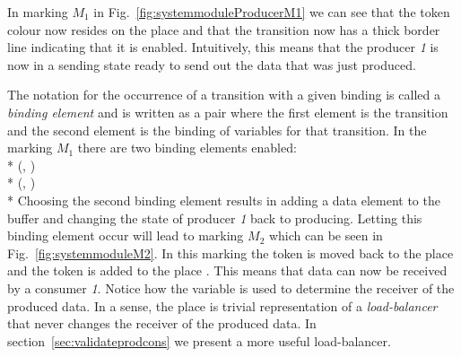 In marking $M_1$ in Fig.~\ref{fig:systemmoduleProducerM1} we can see that the token colour  now resides on the place  and that the transition  now has a thick border line indicating that it is enabled. Intuitively, this means that the producer \emph{1} is now in a sending state ready to send out the data that was just produced. 

The notation for the occurrence of a transition with a given binding is called a \emph{binding element} and is written as a pair where the first element is the transition and the second element is the binding of variables for that transition. In the marking $M_1$ there are two binding elements enabled: \\*
\newline
(, )\\*
(, )\\*
\newline
Choosing the second binding element results in adding a data element to the buffer and changing the state of producer \emph{1} back to producing. Letting this binding element occur will lead to marking $M_2$ which can be seen in Fig.~\ref{fig:systemmoduleM2}. In this marking the token  is moved back to the place  and the token  is added to the place . This means that data can now be received by a consumer \emph{1}. Notice how the variable  is used to determine the receiver of the produced data. In a sense, the place  is trivial representation of a \emph{load-balancer} that never changes the receiver of the produced data. In section~\ref{sec:validateprodcons} we present a more useful load-balancer. 


